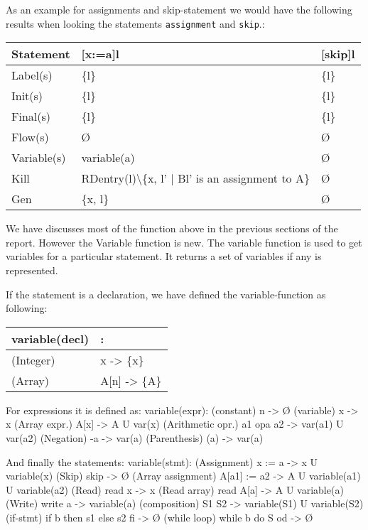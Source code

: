As an example for assignments and skip-statement we would have the following results when looking the statements \texttt{assignment} and \texttt{skip}.:
\\
\begin{tabular}{|l|l|l|}
\hline
\textbf{Statement}&		[x:=a]l&												[skip]l\\
\hline
\hline
Label(s)&		\{l\}&													\{l\}	\\
\hline
Init(s)&			\{l\}&													\{l\}\\
\hline
Final(s)&		\{l\}&													\{l\}\\
\hline
Flow(s)&		Ø&													Ø\\
\hline
Variable(s)&		variable(a)&									Ø\\
\hline
Kill&			RDentry(l)\textbackslash\{x, l' | Bl' is an assignment to A\}&		Ø\\							
\hline
Gen&				\{x, l\}&												Ø\\
\hline
\end{tabular}

We have discusses most of the function above in the previous sections of the report. However the Variable function is new. The variable function is used to get variables for a particular statement. It returns a set of variables if any is represented.

If the statement is a declaration, we have defined the variable-function as following:\\

\begin{tabular}{|l|l|}
\hline
variable(decl)&:\\
\hline\hline
(Integer)&			x -> \{x\}\\
\hline
(Array)&				A[n] -> \{A\}\\
\hline
\end{tabular}

For expressions it is defined as:
variable(expr):
	(constant) 			n -> Ø
	(variable)			x -> {x}
	(Array expr.)		A[x] -> {A} U var(x)
	(Arithmetic opr.)	a1 opa a2 -> var(a1) U var(a2)
	(Negation)			-a -> var(a)
	(Parenthesis)		(a) -> var(a)

And finally the statements:
variable(stmt):
	(Assignment) 		x := a -> {x} U variable(x)	
	(Skip)				skip -> Ø
	(Array assignment)	A[a1] := a2 -> {A} U variable(a1) U variable(a2)
	(Read)				read x -> {x}
	(Read array)		read A[a] -> {A} U variable(a)
	(Write)				write a -> variable(a)
	(composition)		S1 S2 -> variable(S1) U variable(S2)
	(if-stmt)			if b then s1 else s2 fi -> Ø
	(while loop)		while b do S od -> Ø
	
